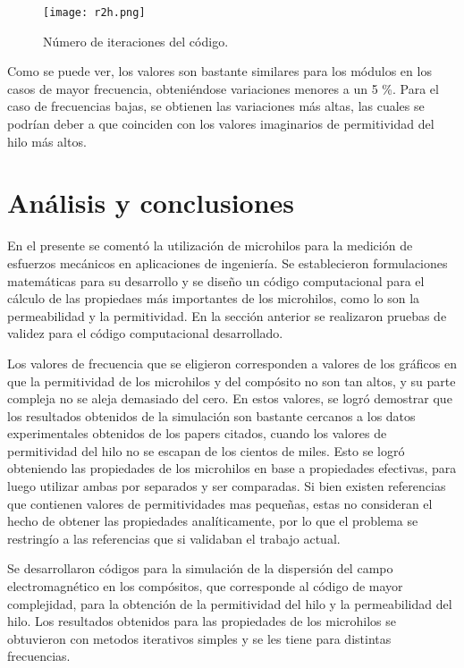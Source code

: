 \documentclass[12pt,letterpaper]{report}
\numberwithin{equation}{section}
\begin{document}
\begin{figure}[H]
	\centering\texttt{[image: r2h.png]}\\
	\caption{Número de iteraciones del código.}
	\label{fig:r2h}
\end{figure} 


Como se puede ver, los valores son bastante similares para los módulos en los casos de mayor frecuencia, obteniéndose variaciones menores a un 5 \%. Para el caso de frecuencias bajas, se obtienen las variaciones más altas, las cuales se podrían deber a que coinciden con los valores imaginarios de permitividad del hilo más altos.


\chapter{Análisis y conclusiones} \label{sec:Analisis y conclusiones}

En el presente se comentó la utilización de microhilos para la medición de esfuerzos mecánicos en aplicaciones de ingeniería. Se establecieron formulaciones matemáticas para su desarrollo  y se diseño un código computacional para el cálculo de las propiedaes más importantes de los microhilos, como lo son la permeabilidad y la permitividad. En la sección anterior se realizaron pruebas de validez para el código computacional desarrollado. 

Los valores de frecuencia que se eligieron corresponden a valores de los gráficos en que la permitividad de los microhilos y del compósito no son tan altos, y su parte compleja no se aleja demasiado del cero. En estos valores, se logró demostrar que los resultados obtenidos de la simulación son bastante cercanos a los datos experimentales obtenidos de los papers citados, cuando los valores de permitividad del hilo no se escapan de los cientos de miles. Esto se logró obteniendo las propiedades de los microhilos en base a propiedades efectivas, para luego utilizar ambas por separados y ser comparadas. Si bien existen referencias que contienen valores de permitividades mas pequeñas, estas no consideran el hecho de obtener las propiedades analíticamente, por lo que el problema se restringío a las referencias que si validaban el trabajo actual.

Se desarrollaron códigos para la simulación de la dispersión del campo electromagnético en los compósitos, que corresponde al código de mayor complejidad, para la obtención de la permitividad del hilo y la permeabilidad del hilo. Los resultados obtenidos para las propiedades de los microhilos se obtuvieron con metodos iterativos simples y se les tiene para distintas frecuencias.
\end{document}
